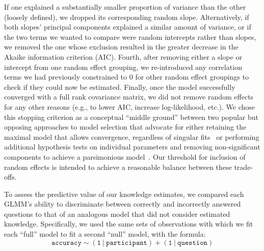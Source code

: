 \documentclass[10pt]{article}
\begin{document}
If one explained a substantially smaller proportion of variance than the other (loosely defined), we dropped its corresponding random slope.
Alternatively, if both slopes' principal components explained a similar amount of variance, or if the two terms we wanted to compare were random intercepts rather than slopes, we removed the one whose exclusion resulted in the greater decrease in the Akaike information criterion (AIC).
Fourth, after removing either a slope or intercept from one random effect grouping, we re-introduced any correlation terms we had previously constrained to 0 for other random effect groupings to check if they could now be estimated. 
Finally, once the model successfully converged with a full rank covariance matrix, we did not remove random effects for any other reasons (e.g., to lower AIC, increase log-likelihood, etc.). 
We chose this stopping criterion as a conceptual ``middle ground'' between two popular but opposing approaches to model selection that advocate for either retaining the maximal model that allows convergence, regardless of singular fits~\citep[at the potential cost of decreased power; e.g.,~][]{BarrEtal13} or performing additional hypothesis tests on individual parameters and removing non-significant components to achieve a parsimonious model~\citep[at the potential cost of increased Type I error rates; e.g.,~][]{BateEtal15b}.
Our threshold for inclusion of random effects is intended to achieve a reasonable balance between these trade-offs.

To assess the predictive value of our knowledge estimates, we compared each GLMM's ability to discriminate between correctly and incorrectly answered questions to that of an analogous model that did not consider estimated knowledge. Specifically, we used the same sets of observations with which we fit each ``full'' model to fit a second ``null'' model, with the formula:
\[
    \mathtt{accuracy \sim (1\ \vert\ participant) + (1\ \vert\ question)}
\]
\end{document}
